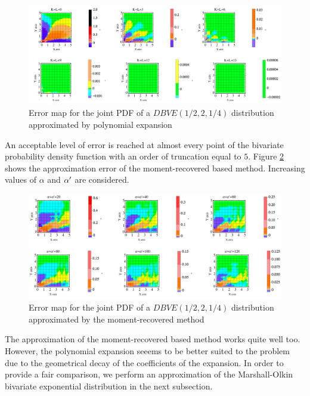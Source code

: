 \begin{center}
	\begin{figure}[!h]
		\begin{center}
			\includegraphics[width=16cm]{Chapitre5/GraphPDFGDBVEPolynomial.png}
			\caption{Error map for the joint PDF of a $DBVE(1/2,2,1/4)$ distribution approximated by polynomial expansion}\label{DBVEPDFPolynomialExpansion}
		\end{center}
	\end{figure}
\end{center}
An acceptable level of error is reached at almost every point of the bivariate probability density function with an order of truncation equal to $5$. Figure \ref{DBVEPDFMnats} shows the approximation error of the moment-recovered based method. Increasing values of $\alpha$ and $\alpha\rq{}$ are considered. 
\begin{center}
	\begin{figure}[!h]
		\begin{center}
			\includegraphics[width=16cm]{Chapitre5/GraphPDFGDBEVEMnats.png}
			\caption{Error map for the joint PDF of a $DBVE(1/2,2,1/4)$ distribution approximated by the moment-recovered method}\label{DBVEPDFMnats}
		\end{center}
	\end{figure}
\end{center}
The approximation of the moment-recovered based method works quite well too. However, the polynomial expansion seeems to be better suited to the problem due to the geometrical decay of the coefficients of the expansion. In order to provide a fair comparison, we perform an approximation of the Marshall-Olkin bivariate exponential distribution in the next subsection. 
